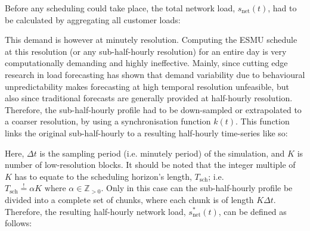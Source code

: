 
Before any scheduling could take place, the total network load, $s_\text{net}(t)$, had to be calculated by aggregating all customer loads:



This demand is however at minutely resolution.
Computing the ESMU schedule at this resolution (or any sub-half-hourly resolution) for an entire day is very computationally demanding and highly ineffective.
Mainly, since cutting edge research in load forecasting has shown that demand variability due to behavioural unpredictability makes forecasting at high temporal resolution unfeasible, but also since traditional forecasts are generally provided at half-hourly resolution.
Therefore, the sub-half-hourly profile had to be down-sampled or extrapolated to a coarser resolution, by using a synchronisation function $k(t)$.
This function links the original sub-half-hourly to a resulting half-hourly time-series like so:




Here, $\Delta t$ is the sampling period (i.e. minutely period) of the simulation, and $K$ is number of low-resolution blocks.
It should be noted that the integer multiple of $K$ has to equate to the scheduling horizon's length, $T_\text{sch}$; i.e. $T_\text{sch} \overset{!}{=} \alpha K \text{ where } \alpha \in \mathbb{Z}_{>0}$.
Only in this case can the sub-half-hourly profile be divided into a complete set of chunks, where each chunk is of length $K\Delta t$.
Therefore, the resulting half-hourly network load, $s^{*}_\text{net}(t)$, can be defined as follows:

